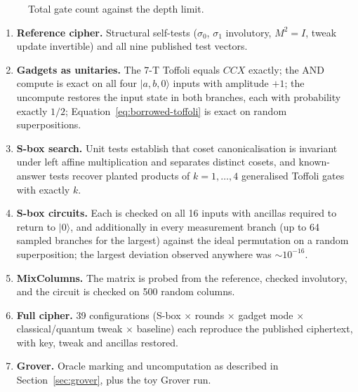 \documentclass[runningheads,10pt]{llncs}
\begin{document}
\begin{figure}[htbp]
\centering
{}
\caption{Total gate count against the depth limit.}
\label{fig:depth-limited}
\end{figure}



\begin{enumerate}
\item \textbf{Reference cipher.} Structural self-tests ($\sigma_0$, $\sigma_1$ involutory, $M^2=I$, tweak update invertible) and all nine published test vectors.
\item \textbf{Gadgets as unitaries.} The 7-T Toffoli equals $CCX$ exactly; the AND compute is exact on all four $|a,b,0\rangle$ inputs with amplitude $+1$; the uncompute restores the input state in both branches, each with probability exactly $1/2$; Equation~\eqref{eq:borrowed-toffoli} is exact on random superpositions.
\item \textbf{S-box search.} Unit tests establish that coset canonicalisation is invariant under left affine multiplication and separates distinct cosets, and known-answer tests recover planted products of $k=1,\ldots,4$ generalised Toffoli gates with exactly $k$.
\item \textbf{S-box circuits.} Each is checked on all 16 inputs with ancillas required to return to $|0\rangle$, and additionally in every measurement branch (up to 64 sampled branches for the largest) against the ideal permutation on a random superposition; the largest deviation observed anywhere was $\sim 10^{-16}$.
\item \textbf{MixColumns.} The matrix is probed from the reference, checked involutory, and the circuit is checked on 500 random columns.
\item \textbf{Full cipher.} 39 configurations (S-box $\times$ rounds $\times$ gadget mode $\times$ classical/quantum tweak $\times$ baseline) each reproduce the published ciphertext, with key, tweak and ancillas restored.
\item \textbf{Grover.} Oracle marking and uncomputation as described in Section~\ref{sec:grover}, plus the toy Grover run.
\end{enumerate}
\end{document}
